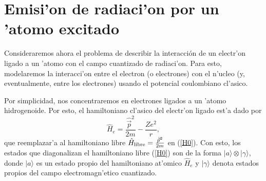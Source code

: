 % 



\section{Emisi'on de radiaci'on por un 'atomo excitado}

Consideraremos ahora el problema de describir la interacción de un electr'on
ligado a un 'atomo con el campo cuantizado de radiaci'on. Para esto,
modelaremos la interacci'on entre el electron (o electrones) con el n'ucleo (y,
eventualmente, entre los electrones) usando el potencial coulombiano cl'asico.

Por simplicidad, nos concentraremos en electrones ligados a un 'atomo
hidrogenoide. Por esto, el hamiltoniano cl'asico del electr'on ligado est'a
dado por
\begin{equation}
 \hat{H}_{e}=\frac{\hat{\vec{p}}^2}{2m}-\frac{Ze^2}{r},
\end{equation} 
que reemplazar'a al hamiltoniano libre $\hat{H}_{\rm
libre}=\frac{\hat{\vec{p}}^2}{2m}$ en (\ref{H0}). Con esto, los estados que
diagonalizan el hamiltoniano libre (\ref{H0}) son de la forma
$|a\rangle \otimes|\gamma\rangle $, donde $|a\rangle $ es un estado propio del
hamiltoniano at'omico  $\hat{H}_{e}$ y $|\gamma\rangle $ denota estados propios
del campo electromagn'etico cuantizado.

